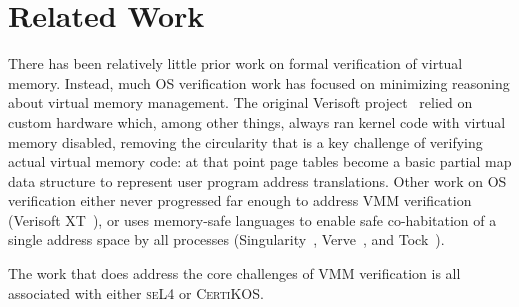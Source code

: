 \section{Related Work}
\label{sec:relwork}

There has been relatively little prior work on formal verification of virtual memory.
Instead, much OS verification work has focused on minimizing reasoning about virtual memory management.
The original Verisoft project~\cite{alkassar2008verisoft,alkassar2010pervasive,alkassar2008formal,dalinger2005verification,hillebrand2005address,alkassar2008formal,starostin2010formal} relied on custom hardware which, among other things, always ran kernel code with virtual memory disabled, removing the circularity that is a key challenge of verifying actual virtual memory code: at that point page tables become a basic partial map data structure to represent user program address translations.
Other work on OS verification either never progressed far enough to address VMM verification (Verisoft XT~\cite{cohen2009vcc,cohen2010local,dahlweid2009vcc,cohen2013SOFSEM}), or uses memory-safe languages to enable safe co-habitation of a single address space by all processes (Singularity~\cite{Fahndrich2006language,Hunt2007singularity,Hunt2007sealing,Barnett2011specsharp}, Verve~\cite{Yang2010Verve}, and Tock~\cite{levy2017multiprogramming}).

The work that does address the core challenges of VMM verification is all associated with either \textsc{seL4} or \textsc{CertiKOS}.

